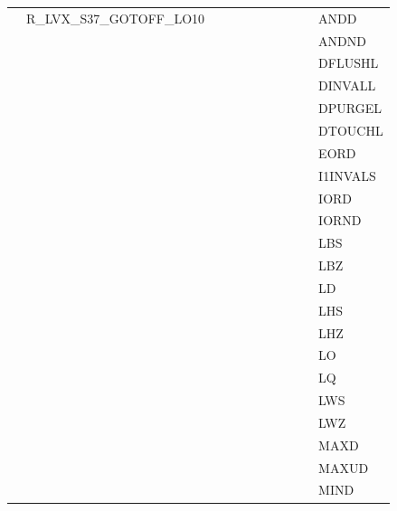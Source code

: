 {\begin{tabular}{|l|l|l|l|l|l|l|l|l|l|l|}
 & \textsf{R\_LVX\_S37\_GOTOFF\_LO10} & & & & & & & & & \textsf{ANDD} \\
 & & & & & & & & & & \textsf{ANDND} \\
 & & & & & & & & & & \textsf{DFLUSHL} \\
 & & & & & & & & & & \textsf{DINVALL} \\
 & & & & & & & & & & \textsf{DPURGEL} \\
 & & & & & & & & & & \textsf{DTOUCHL} \\
 & & & & & & & & & & \textsf{EORD} \\
 & & & & & & & & & & \textsf{I1INVALS} \\
 & & & & & & & & & & \textsf{IORD} \\
 & & & & & & & & & & \textsf{IORND} \\
 & & & & & & & & & & \textsf{LBS} \\
 & & & & & & & & & & \textsf{LBZ} \\
 & & & & & & & & & & \textsf{LD} \\
 & & & & & & & & & & \textsf{LHS} \\
 & & & & & & & & & & \textsf{LHZ} \\
 & & & & & & & & & & \textsf{LO} \\
 & & & & & & & & & & \textsf{LQ} \\
 & & & & & & & & & & \textsf{LWS} \\
 & & & & & & & & & & \textsf{LWZ} \\
 & & & & & & & & & & \textsf{MAXD} \\
 & & & & & & & & & & \textsf{MAXUD} \\
 & & & & & & & & & & \textsf{MIND} \\
\hline\end{tabular}
}
\smallskip

